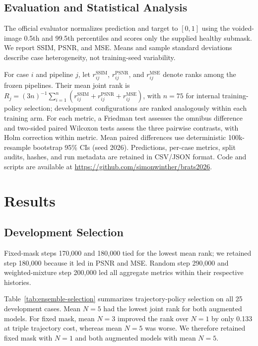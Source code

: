 \documentclass[runningheads]{llncs}
\begin{document}
\subsection{Evaluation and Statistical Analysis} \label{sec:exp:evaluation}

The official evaluator normalizes prediction and target to $[0,1]$ using the voided-image 0.5th and 99.5th percentiles and scores only the supplied healthy submask. We report SSIM, PSNR, and MSE. Means and sample standard deviations describe case heterogeneity, not training-seed variability.

For case $i$ and pipeline $j$, let $r_{ij}^{\mathrm{SSIM}}$, $r_{ij}^{\mathrm{PSNR}}$, and $r_{ij}^{\mathrm{MSE}}$ denote ranks among the frozen pipelines. Their mean joint rank is $\textstyle R_j=(3n)^{-1}\sum_{i=1}^{n}(r_{ij}^{\mathrm{SSIM}}+r_{ij}^{\mathrm{PSNR}}+r_{ij}^{\mathrm{MSE}})$, with $n=75$ for internal training-policy selection; development configurations are ranked analogously within each training arm. For each metric, a Friedman test assesses the omnibus difference and two-sided paired Wilcoxon tests assess the three pairwise contrasts, with Holm correction within metric. Mean paired differences use deterministic 100k-resample bootstrap 95\% CIs (seed 2026). Predictions, per-case metrics, split audits, hashes, and run metadata are retained in CSV/JSON format. Code and scripts are available at \url{https://github.com/simonwinther/brats2026}.

\section{Results} \label{sec:results}

\subsection{Development Selection} \label{sec:results:selection}

Fixed-mask steps 170,000 and 180,000 tied for the lowest mean rank; we retained step 180,000 because it led in PSNR and MSE. Random step 290,000 and weighted-mixture step 200,000 led all aggregate metrics within their respective histories.

Table~\ref{tab:ensemble-selection} summarizes trajectory-policy selection on all 25 development cases. Mean $N=5$ had the lowest joint rank for both augmented models. For fixed mask, mean $N=3$ improved the rank over $N=1$ by only 0.133 at triple trajectory cost, whereas mean $N=5$ was worse. We therefore retained fixed mask with $N=1$ and both augmented models with mean $N=5$.
\end{document}
